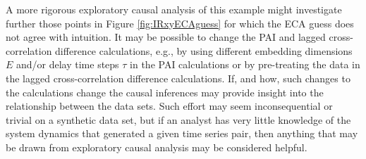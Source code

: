 
A more rigorous exploratory causal analysis of this example might investigate further those points in Figure \ref{fig:IRxyECAguess} for which the ECA guess does not agree with intuition.  It may be possible to change the PAI and lagged cross-correlation difference calculations, e.g., by using different embedding dimensions $E$ and/or delay time steps $\tau$ in the PAI calculations or by pre-treating the data in the lagged cross-correlation difference calculations.  If, and how, such changes to the calculations change the causal inferences may provide insight into the relationship between the data sets.  Such effort may seem inconsequential or trivial on a synthetic data set, but if an analyst has very little knowledge of the system dynamics that generated a given time series pair, then anything that may be drawn from exploratory causal analysis may be considered helpful.  

